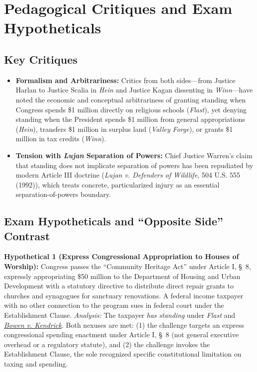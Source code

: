 \documentclass[12pt]{article}
\begin{document}
\section{Pedagogical Critiques and Exam Hypotheticals}
\subsection{Key Critiques}
\begin{itemize}
  \item \textbf{Formalism and Arbitrariness:} Critics from both sides---from Justice Harlan to Justice Scalia in \textit{Hein} and Justice Kagan dissenting in \textit{Winn}---have noted the economic and conceptual arbitrariness of granting standing when Congress spends \$1 million directly on religious schools (\textit{Flast}), yet denying standing when the President spends \$1 million from general appropriations (\textit{Hein}), transfers \$1 million in surplus land (\textit{Valley Forge}), or grants \$1 million in tax credits (\textit{Winn}).
  \item \textbf{Tension with \textit{Lujan} Separation of Powers:} Chief Justice Warren's claim that standing does not implicate separation of powers has been repudiated by modern Article III doctrine (\textit{Lujan v. Defenders of Wildlife}, 504 U.S. 555 (1992)), which treats concrete, particularized injury as an essential separation-of-powers boundary.
\end{itemize}

\subsection{Exam Hypotheticals and ``Opposite Side'' Contrast}
\textbf{Hypothetical 1 (Express Congressional Appropriation to Houses of Worship):} Congress passes the ``Community Heritage Act'' under Article I, \S\ 8, expressly appropriating \$50 million to the Department of Housing and Urban Development with a statutory directive to distribute direct repair grants to churches and synagogues for sanctuary renovations. A federal income taxpayer with no other connection to the program sues in federal court under the Establishment Clause. \textit{Analysis:} The taxpayer \textit{has standing} under \textit{Flast} and \href{https://supreme.justia.com/cases/federal/us/487/589/}{\textit{Bowen v. Kendrick}}. Both nexuses are met: (1) the challenge targets an express congressional spending enactment under Article I, \S\ 8 (not general executive overhead or a regulatory statute), and (2) the challenge invokes the Establishment Clause, the sole recognized specific constitutional limitation on taxing and spending.
\end{document}
